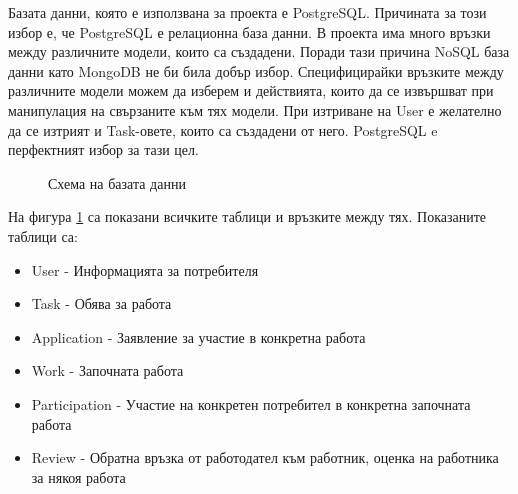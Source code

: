 Базата данни, която е използвана за проекта е PostgreSQL. Причината за този избор е, че PostgreSQL е релационна база данни. В проекта има много връзки между различните модели, които са създадени. Поради тази причина NoSQL база данни като MongoDB не би била добър избор. Специфицирайки връзките между различните модели можем да изберем и действията, които да се извършват при манипулация на свързаните към тях модели. При изтриване на User е желателно да се изтрият и Task-овете, които са създадени от него. PostgreSQL e перфектният избор за тази цел.

\begin{figure}[h]
    \centering
    \caption{Схема на базата данни}
    \label{fig:database_schema}
\end{figure}

\newpage

На фигура \ref{fig:database_schema} са показани всичките таблици и връзките между тях. Показаните таблици са:

\begin{itemize}
    \item User - Информацията за потребителя
    \item Task - Обява за работа
    \item Application - Заявление за участие в конкретна работа
    \item Work - Започната работа
    \item Participation - Участие на конкретен потребител в конкретна започната работа
    \item Review - Обратна връзка от работодател към работник, оценка на работника за някоя работа
\end{itemize}